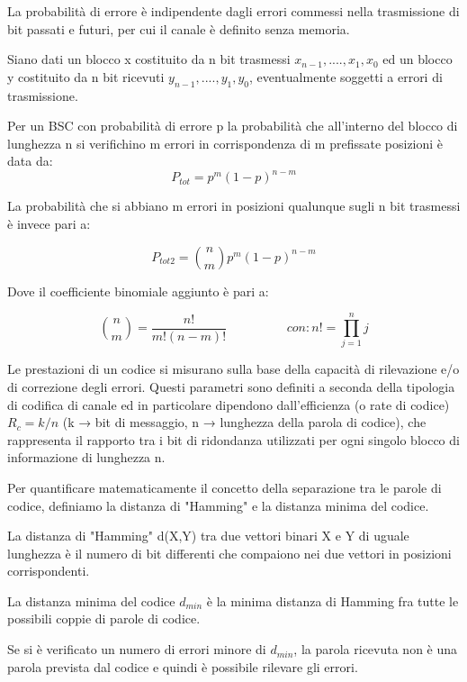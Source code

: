 \documentclass[LaM,binding=0.6cm]{../sapthesis}
\begin{document}
La probabilità di errore è indipendente dagli errori commessi nella trasmissione di bit passati e futuri, per cui il canale è definito senza memoria.

Siano dati un blocco x costituito da n bit trasmessi $x_{n-1},....,x_1,x_0$ ed un blocco y costituito da n bit ricevuti $y_{n-1},....,y_1,y_0$, eventualmente soggetti a errori di trasmissione.

Per un BSC con probabilità di errore p la probabilità che all'interno del blocco di lunghezza n si verifichino m errori in corrispondenza di m prefissate posizioni è data da:
\begin{equation}
    P_{tot} = p^{m} (1-p)^{n-m}
\end{equation}

La probabilità che si abbiano m errori in posizioni qualunque sugli n bit trasmessi  è invece pari a:

\begin{equation}
    P_{tot2} = \binom{n}{m} p^{m} (1-p)^{n-m}
\end{equation}

Dove il coefficiente binomiale aggiunto è pari a:

\begin{equation}
    \binom{n}{m} = \frac{n!}{m! (n-m)!}  \hspace{2cm} con: n! = \prod_{j=1}^{n}j
\end{equation}


Le  prestazioni  di  un  codice  si  misurano  sulla  base  della
capacità di rilevazione e/o di correzione degli errori. Questi parametri sono definiti a seconda della tipologia di codifica di canale ed in particolare dipendono dall’efficienza (o rate di codice) $R_c=k/n$ (k → bit di messaggio, n → lunghezza
della parola di codice), che rappresenta il rapporto tra i bit di ridondanza utilizzati per ogni singolo blocco di informazione di lunghezza n.

Per  quantificare  matematicamente  il  concetto  della  separazione
tra  le  parole  di  codice,  definiamo  la  distanza  di  "Hamming"  e  la distanza minima del codice.

La distanza  di  "Hamming" d(X,Y)  tra  due  vettori  binari  X  e  Y  di
uguale  lunghezza  è  il  numero  di  bit  differenti  che  compaiono  nei due vettori in posizioni corrispondenti.

La distanza minima del codice $d_{min}$ è la minima distanza di
Hamming fra tutte le possibili coppie di parole di codice.


Se  si  è  verificato  un  numero  di  errori  minore  di  $d_{min}$,  la  parola
ricevuta non è una parola prevista dal codice e quindi è possibile
rilevare gli errori.
\end{document}
